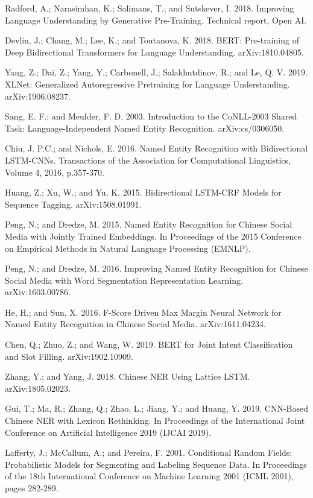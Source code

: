 \documentclass[letterpaper]{article} %
\begin{document}
\smallskip \noindent
Radford, A.; Narasimhan, K.; Salimans, T.; and Sutskever, I. 2018. Improving Language Understanding by Generative Pre-Training. Technical report, Open AI.

\smallskip \noindent
Devlin, J.; Chang, M.; Lee, K.; and Toutanova, K. 2018. BERT: Pre-training of Deep Bidirectional Transformers for Language Understanding. arXiv:1810.04805.

\smallskip \noindent
Yang, Z.; Dai, Z.; Yang, Y.; Carbonell, J.; Salakhutdinov, R.; and Le, Q. V. 2019. XLNet: Generalized Autoregressive Pretraining for Language Understanding. arXiv:1906.08237.

\smallskip \noindent
Sang, E. F.; and Meulder, F. D. 2003. Introduction to the CoNLL-2003 Shared Task: Language-Independent Named Entity Recognition. arXiv:cs/0306050. 

\smallskip \noindent
Chiu, J. P.C.; and Nichols, E. 2016. Named Entity Recognition with Bidirectional LSTM-CNNs. Transactions of the Association for Computational Linguistics, Volume 4, 2016, p.357-370. 

\smallskip \noindent
Huang, Z.; Xu, W.; and Yu, K. 2015. Bidirectional LSTM-CRF Models for Sequence Tagging. arXiv:1508.01991. 

\smallskip \noindent
Peng, N.; and Dredze, M. 2015. Named Entity Recognition for Chinese Social Media with Jointly Trained Embeddings. In Proceedings of the 2015 Conference on Empirical Methods in Natural Language Processing (EMNLP). 

\smallskip \noindent
Peng, N.; and Dredze, M. 2016. Improving Named Entity Recognition for Chinese Social Media with Word Segmentation Representation Learning. arXiv:1603.00786. 

\smallskip \noindent
He, H.; and Sun, X. 2016. F-Score Driven Max Margin Neural Network for Named Entity Recognition in Chinese Social Media. 	arXiv:1611.04234. 

\smallskip \noindent
Chen, Q.; Zhuo, Z.; and Wang, W. 2019. BERT for Joint Intent Classification and Slot Filling. arXiv:1902.10909. 

\smallskip \noindent
Zhang, Y.; and Yang, J. 2018. Chinese NER Using Lattice LSTM. arXiv:1805.02023. 

\smallskip \noindent
Gui, T.; Ma, R.; Zhang, Q.; Zhao, L.; Jiang, Y.; and Huang, Y. 2019. CNN-Based Chinese NER with Lexicon Rethinking. In Proceedings of the International Joint Conference on Artificial Intelligence 2019 (IJCAI 2019). 

\smallskip \noindent
Lafferty, J.; McCallum, A.; and Pereira, F. 2001. Conditional Random Fields: Probabilistic Models for Segmenting and Labeling Sequence Data. In Proceedings of the 18th International Conference on Machine Learning 2001 (ICML 2001), pages 282-289.
\end{document}
